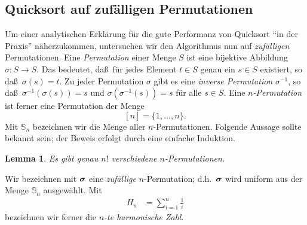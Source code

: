 \documentclass[10pt,reqno]{amsart}
\numberwithin{equation}{section}
\renewcommand\SS{\mathbb S}
\def\vec#1{\mathchoice{\mbox{\boldmath$\displaystyle#1$}}
{\mbox{\boldmath$\textstyle#1$}}
{\mbox{\boldmath$\scriptstyle#1$}}
{\mbox{\boldmath$\scriptscriptstyle#1$}}}
\newtheorem{lemma}[definition]{Lemma}
\begin{document}
\subsection{Quicksort auf zuf\"alligen Permutationen}\label{sec_random_qs}
Um einer analytischen Erkl\"arung f\"ur die gute Performanz von Quicksort ``in der Praxis'' n\"aherzukommen, untersuchen wir den Algorithmus nun auf {\em zuf\"alligen} Permutationen.
Eine {\em Permutation} einer Menge $S$ ist eine bijektive Abbildung $\sigma:S\to S$.
Das bedeutet, da\ss\ f\"ur jedes Element $t\in S$ genau ein $s\in S$ existiert, so da\ss\ $\sigma(s)=t$.
Zu jeder Permutation $\sigma$ gibt es eine {\em inverse Permutation} $\sigma^{-1}$, so da\ss\ $\sigma^{-1}(\sigma(s))=s$ und $\sigma(\sigma^{-1}(s))=s$ f\"ur alle $s\in S$.
Eine {\em $n$-Permutation} ist ferner eine Permutation der Menge
	$$[n]=\{1,\ldots,n\}.$$
Mit $\SS_n$ bezeichnen wir die Menge aller $n$-Permutationen.
Folgende Aussage sollte bekannt sein; der Beweis erfolgt durch eine einfache Induktion.

\begin{lemma}\label{lem_perm}
Es gibt genau $n!$ verschiedene $n$-Permutationen.
\end{lemma}

Wir bezeichnen mit $\vec\sigma$ eine {\em zuf\"allige} $n$-Permutation; d.h.\ $\vec\sigma$ wird uniform aus der Menge $\SS_n$ ausgew\"ahlt.
Mit
\begin{align*}
	H_n&=\sum_{i=1}^n\frac1i
\end{align*}
bezeichnen wir ferner die {\em $n$-te harmonische Zahl}.
\end{document}
